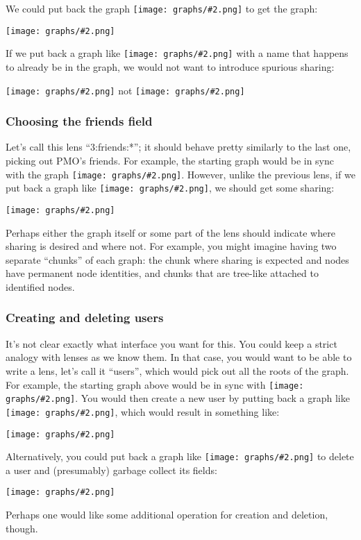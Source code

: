 \documentclass{article}
\newcommand{\scaledgraph}[2]{\texttt{[image: graphs/\#2.png]}}
\newcommand{\graph}[1]{\scaledgraph{0.5}{#1}}
\newcommand{\centeredgraph}[1]{\begin{center}\graph{#1}\end{center}}
\newcommand{\inlinegraph}[1]{\scaledgraph{0.2}{#1}}
\begin{document}
We could put back the graph \inlinegraph{facebook-name-dmw} to get the
graph:

\centeredgraph{facebook-start-dmw}

If we put back a graph like \inlinegraph{facebook-name-jp} with a name that
happens to already be in the graph, we would not want to introduce spurious
sharing:

\begin{center}
    \graph{facebook-start-jp} not \graph{facebook-spurious-sharing}
\end{center}

\subsubsection*{Choosing the friends field}

Let's call this lens ``3:friends:*''; it should behave pretty similarly to the
last one, picking out PMO's friends. For example, the starting graph would
be in sync with the graph \inlinegraph{facebook-friends}. However, unlike
the previous lens, if we put back a graph like
\inlinegraph{facebook-friends-1}, we should get some sharing:

\centeredgraph{facebook-start-more-friends}

Perhaps either the graph itself or some part of the lens should indicate
where sharing is desired and where not. For example, you might imagine
having two separate ``chunks'' of each graph: the chunk where sharing is
expected and nodes have permanent node identities, and chunks that are
tree-like attached to identified nodes.

\subsubsection*{Creating and deleting users}

It's not clear exactly what interface you want for this. You could keep a
strict analogy with lenses as we know them. In that case, you would want to
be able to write a lens, let's call it ``users'', which would pick out all
the roots of the graph. For example, the starting graph above would be in
sync with \inlinegraph{facebook-roots}. You would then create a new user by
putting back a graph like \inlinegraph{facebook-more-roots}, which would
result in something like:
\centeredgraph{facebook-start-more-roots}
Alternatively, you could put back a graph like
\inlinegraph{facebook-fewer-roots} to delete a user and (presumably) garbage
collect its fields:
\centeredgraph{facebook-start-fewer-roots}
Perhaps one would like some additional operation for creation and deletion,
though.
\end{document}
